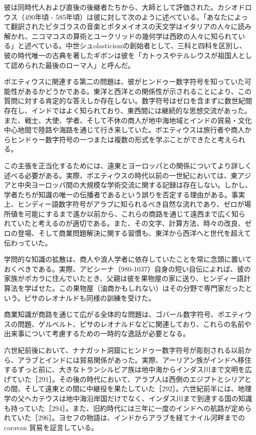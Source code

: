 \documentclass[a4paper,11pt,openany]{ltjsbook}
\begin{document}
彼は同時代人および直後の後継者たちから、大師として評価された。カシオドロウス（490年頃 - 585年頃）は彼に対して次のように述べている。「あなたによって翻訳されたピタゴラスの音楽とポタメイオスの天文学はイタリアの人々に読み解かれ、ニコマコスの算術とユークリッドの幾何学は西欧の人々に知られている」と述べている。中世シュolasticismの創始者として、三科と四科を区別し、彼の時代唯一の古典を著したギボンは彼を「カトゥスやテルレウスが祖国人として認められた最後のローマ人」と呼んだ。

ボエティウスに関連する第二の問題は、彼がヒンドゥー数字符号を知っていた可能性があるかどうかである。東洋と西洋との関係性が示されることにより、この質問に対する肯定的な答えしか存在しない。数字符号はゼロを含まずに数世紀間存在し、インドではよく知られており、東西間には継続的な思想交流があった。また、戦士、大使、学者、そして不休の商人が地中海地域とインドの貿易・文化中心地間で陸路や海路を通じて行き来していた。ボエティウスは旅行者や商人からヒンドゥー数字符号の一つまたは複数の形式を学ぶことができたと考えられる。

この主張を正当化するためには、遠東とヨーロッパとの関係についてより詳しく述べる必要がある。実際、ボエティウスの時代以前の一世紀においては、東アジアと中央ヨーロッパ間の大規模な学術交流に関する記録は存在しない。しかし、学者たちが知識の唯一の伝播者であるという誤りを否定する理由がある。事実上、ヒンディー語数字符号がアラブに知られるべき自然な流れであり、ゼロが場所値を可能にするまで遙か以前から、これらの商路を通じて遠西まで広く知られていたと考えるのが適切である。また、その文字、計算方法、時々の改良、ゼロの登場、そして商業問題解決に関する習慣も、東洋から西洋へと世代を超えて伝わっていた。

学問的な知識の拡散は、商人や浪人学者に依存していたことを常に念頭に置いておくべきである。実際、アビシーナ（980-1037）自身の短い自伝によれば、彼の家族がボカラに住んでいたとき、父親は彼を果物屋の家に送り、ヒンディー語計算法を学ばせた。この果物屋（油商かもしれない）はその分野で専門家だったという。ピサのレオナルドも同様の訓練を受けた。

商業知識が商路を通じて広がる全体的な問題は、ゴバール数字符号、ボエティウスの問題、ゲルベルト、ピサのレオナルドなどに関連しており、これらの名前や出来事について考慮するための一時的な逸話が必要となる。

六世紀前後において、ナナガット洞窟にヒンドゥー数字符号が彫刻される以前から、アラブとインドには貿易関係があった。実際、アーリアン族がインドへ移住するずっと前に、大きなトランシルビア族は地中海からインダス川まで文明を広げていた［291］。その後の時代において、アラブ人は西側のエジプトとシリアとの間、そして遠東との間に中継役を果たしていた［292］。六世紀前半には、地理学の父ヘカテウスは地中海沿岸国だけでなく、インダス川まで到達する国の知識も持っていた［294］。また、旧約時代には三年に一度のインドへの航路が定められていた［296］。ヨセフの物語は、インドからアラブを経てナイル河畔までの caravan 貿易を証言している。
\end{document}
